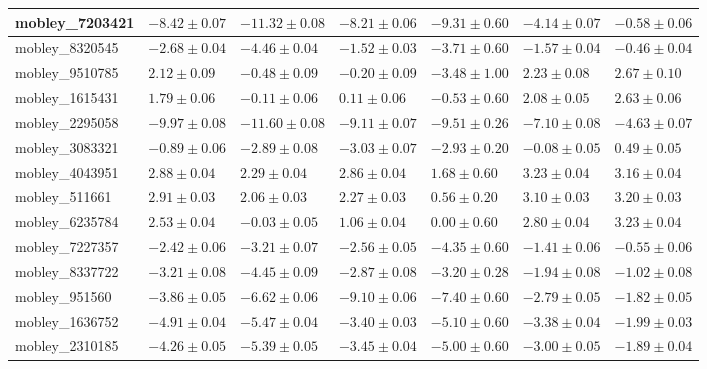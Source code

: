 \documentclass{article}
\begin{document}
\begin{landscape}
\begin{longtable}{|l{3.0cm}|l{3.0cm}|l{3.2cm}|l{3.6cm}|l{3.0cm}|l{3.0cm}|l{3.0cm}|}
mobley\_7203421	&	$	-8.42	\pm	0.07	$	&	$	-11.32	\pm	0.08	$	&	$	-8.21	\pm	0.06	$	&	$	-9.31	\pm	0.60	$	&	$	-4.14	\pm	0.07	$	&	$	-0.58	\pm	0.06	$	\\ \hline
mobley\_8320545	&	$	-2.68	\pm	0.04	$	&	$	-4.46	\pm	0.04	$	&	$	-1.52	\pm	0.03	$	&	$	-3.71	\pm	0.60	$	&	$	-1.57	\pm	0.04	$	&	$	-0.46	\pm	0.04	$	\\ \hline
mobley\_9510785	&	$	2.12	\pm	0.09	$	&	$	-0.48	\pm	0.09	$	&	$	-0.20	\pm	0.09	$	&	$	-3.48	\pm	1.00	$	&	$	2.23	\pm	0.08	$	&	$	2.67	\pm	0.10	$	\\ \hline
mobley\_1615431	&	$	1.79	\pm	0.06	$	&	$	-0.11	\pm	0.06	$	&	$	0.11	\pm	0.06	$	&	$	-0.53	\pm	0.60	$	&	$	2.08	\pm	0.05	$	&	$	2.63	\pm	0.06	$	\\ \hline
mobley\_2295058	&	$	-9.97	\pm	0.08	$	&	$	-11.60	\pm	0.08	$	&	$	-9.11	\pm	0.07	$	&	$	-9.51	\pm	0.26	$	&	$	-7.10	\pm	0.08	$	&	$	-4.63	\pm	0.07	$	\\ \hline
mobley\_3083321	&	$	-0.89	\pm	0.06	$	&	$	-2.89	\pm	0.08	$	&	$	-3.03	\pm	0.07	$	&	$	-2.93	\pm	0.20	$	&	$	-0.08	\pm	0.05	$	&	$	0.49	\pm	0.05	$	\\ \hline
mobley\_4043951	&	$	2.88	\pm	0.04	$	&	$	2.29	\pm	0.04	$	&	$	2.86	\pm	0.04	$	&	$	1.68	\pm	0.60	$	&	$	3.23	\pm	0.04	$	&	$	3.16	\pm	0.04	$	\\ \hline
mobley\_511661	&	$	2.91	\pm	0.03	$	&	$	2.06	\pm	0.03	$	&	$	2.27	\pm	0.03	$	&	$	0.56	\pm	0.20	$	&	$	3.10	\pm	0.03	$	&	$	3.20	\pm	0.03	$	\\ \hline
mobley\_6235784	&	$	2.53	\pm	0.04	$	&	$	-0.03	\pm	0.05	$	&	$	1.06	\pm	0.04	$	&	$	0.00	\pm	0.60	$	&	$	2.80	\pm	0.04	$	&	$	3.23	\pm	0.04	$	\\ \hline
mobley\_7227357	&	$	-2.42	\pm	0.06	$	&	$	-3.21	\pm	0.07	$	&	$	-2.56	\pm	0.05	$	&	$	-4.35	\pm	0.60	$	&	$	-1.41	\pm	0.06	$	&	$	-0.55	\pm	0.06	$	\\ \hline
mobley\_8337722	&	$	-3.21	\pm	0.08	$	&	$	-4.45	\pm	0.09	$	&	$	-2.87	\pm	0.08	$	&	$	-3.20	\pm	0.28	$	&	$	-1.94	\pm	0.08	$	&	$	-1.02	\pm	0.08	$	\\ \hline
mobley\_951560	&	$	-3.86	\pm	0.05	$	&	$	-6.62	\pm	0.06	$	&	$	-9.10	\pm	0.06	$	&	$	-7.40	\pm	0.60	$	&	$	-2.79	\pm	0.05	$	&	$	-1.82	\pm	0.05	$	\\ \hline
mobley\_1636752	&	$	-4.91	\pm	0.04	$	&	$	-5.47	\pm	0.04	$	&	$	-3.40	\pm	0.03	$	&	$	-5.10	\pm	0.60	$	&	$	-3.38	\pm	0.04	$	&	$	-1.99	\pm	0.03	$	\\ \hline
mobley\_2310185	&	$	-4.26	\pm	0.05	$	&	$	-5.39	\pm	0.05	$	&	$	-3.45	\pm	0.04	$	&	$	-5.00	\pm	0.60	$	&	$	-3.00	\pm	0.05	$	&	$	-1.89	\pm	0.04	$	\\ \hline

\end{longtable}
\end{landscape}
\end{document}
